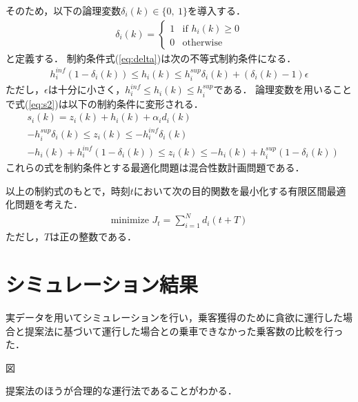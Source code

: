 \documentclass[a4j,9pt,twocolumn]{paper}
\begin{document}
そのため，以下の論理変数$\delta_i(k) \in \{ 0,\ 1\}$を導入する．
\begin{align}
 \delta_i(k)=
\left\{ \begin{array}{ll}
1 & \mbox{if }h_i(k)\geq 0 \\
0 & \mbox{otherwise}
\end{array} \right. \label{eq:delta}
\end{align}
と定義する．
制約条件式(\ref{eq:delta})は次の不等式制約条件になる．
\begin{align}
 h^{inf}_{i}(1-\delta_i(k))\leq h_i(k) \leq h^{sup}_{i} \delta_i(k)+(\delta_i(k) -1) \epsilon \label{eq:delta_new}
\end{align}
ただし，$\epsilon$は十分に小さく，$h^{inf}_{i}\leq h_i(k)\leq h^{sup}_{i}$である．
論理変数を用いることで式(\ref{eq:s2})は以下の制約条件に変形される．
\begin{align}
& s_i(k) = z_i(k)+h_i(k)+\alpha_i d_i(k)\\
& -h^{sup}_{i} \delta_i(k) \leq z_i(k) \leq -h^{inf}_{i} \delta_i(k)\\
& -h_i(k)+h^{inf}_i (1-\delta_i(k)) \leq z_i(k) \leq -h_i(k)+h^{sup}_i (1-\delta_i(k))
\end{align}
これらの式を制約条件とする最適化問題は混合性数計画問題である．

以上の制約式のもとで，時刻$t$において次の目的関数を最小化する有限区間最適化問題を考えた．
\begin{align}
\mbox{minimize }J_t=\sum_{i=1}^{N}d_i(t+T) \label{eq:ob_function}
\end{align}
ただし，$T$は正の整数である．


\section{シミュレーション結果}
実データを用いてシミュレーションを行い，乗客獲得のために貪欲に運行した場合と提案法に基づいて運行した場合との乗車できなかった乗客数の比較を行った．

図

提案法のほうが合理的な運行法であることがわかる．
%
%
\newpage
\pagebreak
\end{document}
